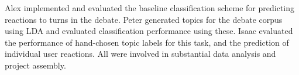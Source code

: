 
Alex implemented and evaluated the baseline classification scheme for predicting
reactions to turns in the debate.
Peter generated topics for the debate corpus using LDA and evaluated classification
performance using these.
Isaac evaluated the performance of hand-chosen topic labels for this task,
and the prediction of individual user reactions.
All were involved in substantial data analysis and project assembly.